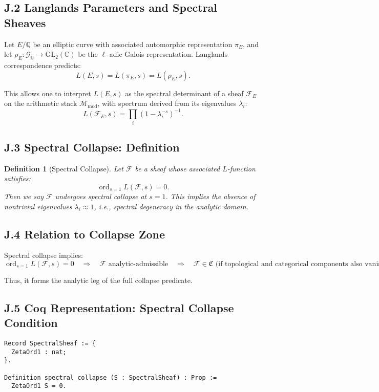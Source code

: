 \documentclass[11pt]{article}
\newtheorem{definition}[theorem]{Definition}
\newcommand{\ord}{\operatorname{ord}}
\begin{document}
\subsection*{J.2 Langlands Parameters and Spectral Sheaves}

Let \( E/\mathbb{Q} \) be an elliptic curve with associated automorphic representation \( \pi_E \), and let \( \rho_E: \mathcal{G}_{\mathbb{Q}} \to \mathrm{GL}_2(\mathbb{C}) \) be the \( \ell \)-adic Galois representation. Langlands correspondence predicts:
\[
L(E, s) = L(\pi_E, s) = L(\rho_E, s).
\]

This allows one to interpret \( L(E, s) \) as the spectral determinant of a sheaf \( \mathcal{F}_E \) on the arithmetic stack \( \mathcal{M}_{\mathrm{mod}} \), with spectrum derived from its eigenvalues \( \lambda_i \):
\[
L(\mathcal{F}_E, s) = \prod_i (1 - \lambda_i^{-s})^{-1}.
\]

\subsection*{J.3 Spectral Collapse: Definition}

\begin{definition}[Spectral Collapse]
Let \( \mathcal{F} \) be a sheaf whose associated \( L \)-function satisfies:
\[
\ord_{s=1} L(\mathcal{F}, s) = 0.
\]
Then we say \( \mathcal{F} \) undergoes \emph{spectral collapse} at \( s = 1 \). This implies the absence of nontrivial eigenvalues \( \lambda_i \approx 1 \), i.e., spectral degeneracy in the analytic domain.
\end{definition}

\subsection*{J.4 Relation to Collapse Zone}

Spectral collapse implies:
\[
\ord_{s=1} L(\mathcal{F}, s) = 0 \quad \Rightarrow \quad \mathcal{F} \text{ analytic-admissible} \quad \Rightarrow \quad \mathcal{F} \in \mathfrak{C} \text{ (if topological and categorical components also vanish)}.
\]

Thus, it forms the analytic leg of the full collapse predicate.

\subsection*{J.5 Coq Representation: Spectral Collapse Condition}
\begin{lstlisting}[language=Coq]
Record SpectralSheaf := {
  ZetaOrd1 : nat;
}.

Definition spectral_collapse (S : SpectralSheaf) : Prop :=
  ZetaOrd1 S = 0.
\end{lstlisting}
\end{document}
